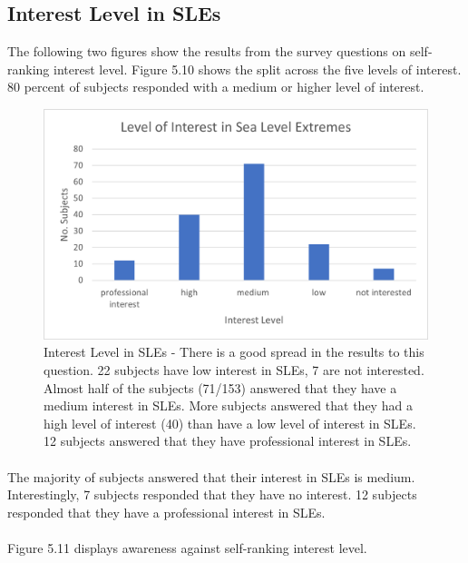 \subsection{Interest Level in SLEs}
The following two figures show the results from the survey questions on self-ranking interest level.  Figure 5.10 shows the split across the five levels of interest. 80 percent of subjects responded with a medium or higher level of interest. 


\begin{figure}[H]
    \centering
    \includegraphics{fig_results/interest-level.png}
    \caption{Interest Level in SLEs - There is a good spread in the results to this question. 22 subjects have low interest in SLEs, 7 are not interested.  Almost half of the subjects (71/153) answered that they have a medium interest in SLEs. More subjects answered that they had a high level of interest (40) than have a low level of interest in SLEs. 12 subjects answered that they have professional interest in SLEs. }
    \label{fig:my_interest_level}
\end{figure}
\paragraph{}

The majority of subjects answered that their interest in SLEs is medium. Interestingly, 7 subjects responded that they have no interest. 12 subjects responded that they have a professional interest in SLEs. 
\paragraph{}
Figure 5.11 displays awareness against self-ranking interest level.

